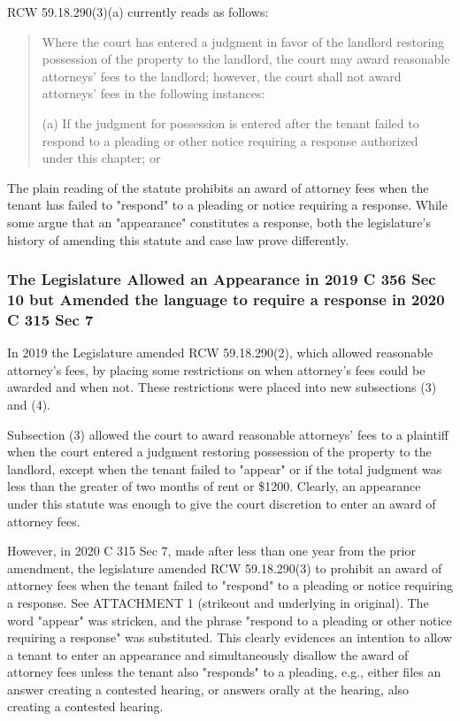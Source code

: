 \documentclass[11pt]{article}
\begin{document}
RCW 59.18.290(3)(a) currently reads as follows:

\begin{quote}
Where  the court  has  entered a  judgment in  favor  of the  landlord
restoring possession  of the property  to the landlord, the  court may
award reasonable attorneys'  fees to the landlord;  however, the court
shall not award attorneys' fees in the following instances:

(a) If the judgment for possession  is entered after the tenant failed
to  respond  to  a  pleading  or other  notice  requiring  a  response
authorized under this chapter; or
\end{quote}

The plain reading of the statute prohibits an award of attorney fees when the tenant has failed to "respond" to a pleading or notice requiring a response.
While some argue that an "appearance" constitutes a response, both the legislature's history of amending this statute and case law prove differently.

\subsubsection{The Legislature Allowed an Appearance in 2019 C 356 Sec 10 but Amended the language to require a response in 2020 C 315 Sec 7}
\label{sec:orgd441633}

In 2019 the Legislature amended RCW 59.18.290(2), which allowed reasonable attorney's fees, by placing some restrictions on when attorney's fees could be awarded and when not.
These restrictions were placed into new subsections (3) and (4).

Subsection (3) allowed the court to award reasonable attorneys' fees to a plaintiff when the court entered a judgment restoring possession of the property to the landlord, except
when the tenant failed to "appear" or if the total judgment was less than the greater of two months of rent or \$1200.  Clearly, an appearance under this statute was enough to
give the court discretion to enter an award of attorney fees.

However, in 2020 C 315 Sec 7, made after less than one year from the prior amendment, the legislature amended RCW 59.18.290(3) to prohibit an award of attorney fees
when the tenant failed to "respond" to a pleading or notice requiring a response.  See ATTACHMENT 1 (strikeout and underlying in original).  The word "appear" was stricken,
and the phrase "respond to a pleading or other notice requiring a response" was substituted.  This clearly evidences an intention to allow a tenant to enter an appearance
and simultaneously disallow the award of attorney fees unless the tenant also "responds" to a pleading, e.g., either files an answer creating a contested hearing,
or answers orally at the hearing, also creating a contested hearing.
\end{document}
